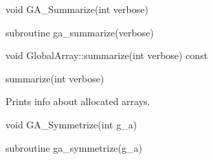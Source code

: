 \documentclass[12pt]{article}
\begin{document}

\begin{capi}
\begin{ccode}
void GA_Summarize(int verbose)
\end{ccode}
\begin{funcargs}
\end{funcargs}
\end{capi}

\begin{fapi}
\begin{fcode}
subroutine ga_summarize(verbose)
\end{fcode}
\begin{funcargs}
\end{funcargs}
\end{fapi}

\begin{cxxapi}
\begin{cxxcode}
void GlobalArray::summarize(int verbose) const
\end{cxxcode}
\begin{funcargs}
\end{funcargs}
\end{cxxapi}

\begin{pyapi}
\begin{pycode}
summarize(int verbose)
\end{pycode}
\end{pyapi}

\begin{desc}

Prints info about allocated arrays.
\end{desc}


\begin{capi}
\begin{ccode}
void GA_Symmetrize(int g_a)
\end{ccode}
\begin{funcargs}
\end{funcargs}
\end{capi}

\begin{fapi}
\begin{fcode}
subroutine ga_symmetrize(g_a)
\end{fcode}
\begin{funcargs}
\end{funcargs}
\end{fapi}
\end{document}
